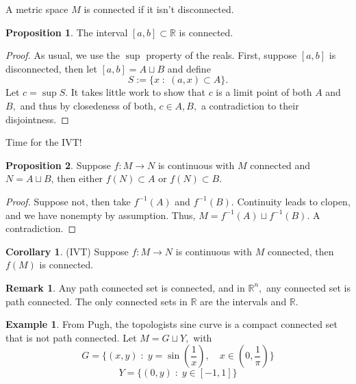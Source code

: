 \documentclass[10pt, oneside]{article}
\newcommand{\bbR}{\mathbb{R}}
\theoremstyle{definition}
\newtheorem{exmp}{Example}[section]
\newtheorem{prop}{Proposition}
\newtheorem{rem}{Remark}
\newtheorem{cor}{Corollary}
\begin{document}
A metric space $M$ is connected if it isn't disconnected.
\begin{prop}
    The interval $[a,b] \subset \bbR$ is connected.
\end{prop}
\begin{proof}
    As usual, we use the $\sup$ property of the reals. First, suppose $[a,b]$ is disconnected, then let $[a,b]  = A \sqcup B$ and define 
    \[S:= \{x \; : \; (a,x)\subset A\}.\] Let $c = \sup S.$ It takes little work to show that $c$ is a limit point of both $A$ and $B,$ and thus by closedeness of both, $c\in A, B,$ a contradiction to their disjointness.
\end{proof}
Time for the IVT!
\begin{prop}
    Suppose $f: M \to N$ is continuous with $M$ connected and $N = A \sqcup B$, then either $f(N)\subset A$ or $f(N)\subset B.$
\end{prop}
\begin{proof}
    Suppose not, then take $f^{-1}(A)$ and $f^{-1}(B).$ Continuity leads to clopen, and we have nonempty by assumption. Thus, $M  = f^{-1}(A)\sqcup f^{-1}(B).$ A contradiction.
\end{proof}
\begin{cor}
    (IVT) Suppose $f: M \to N$ is continuous with $M$ connected, then $f(M)$ is connected.
\end{cor}
\begin{rem}
    Any path connected set is connected, and in $\bbR^n,$ any connected set is path connected. The only connected sets in $\bbR$ are the intervals and $\bbR.$
\end{rem}
\begin{exmp}
    From Pugh, the topologists sine curve is a compact connected set that is not path connected. Let $M = G \sqcup Y,$ with 
    \[G = \{(x,y) \; : \; y = \sin(\frac{1}{x}), \quad x \in (0,\frac{1}{\pi})\}\]
    \[Y = \{(0,y) \; : \; y \in [-1,1]\}\]
\end{exmp}
\newpage
\end{document}
